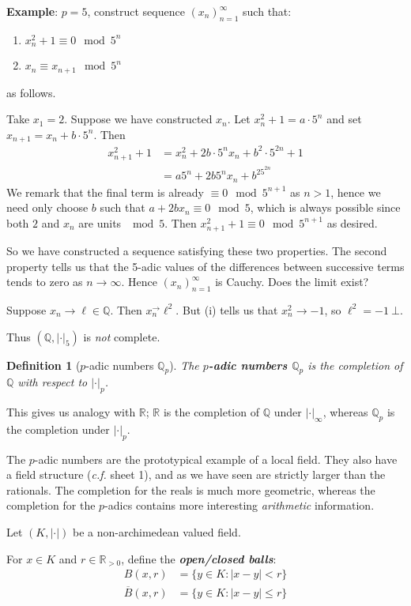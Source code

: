 \documentclass[]{article}
\theoremstyle{custhm}
\theoremstyle{cusdef}
\newtheorem{defin}[theorem]{Definition}
\theoremstyle{custhm}
\theoremstyle{custhm}
\theoremstyle{custhm}
\theoremstyle{custhm}
\theoremstyle{cusdef}
\theoremstyle{remark}
\newcommand{\Q}{\mathbb{Q}}
\newcommand{\R}{\mathbb{R}}
\newcommand{\ra}{\rightarrow}
\newcommand{\undf}[1]{\textit{\textbf{#1}}}
\renewcommand{\it}[1]{\textit{#1}}
\newcommand{\val}[1]{\left|#1\right|}
\newcommand{\valk}{(K,|\cdot|)}
\renewcommand{\bar}{\overline}
\begin{document}
\textbf{Example}: $p = 5$, construct sequence $(x_n)_{n=1}^{\infty}$ such that:
\begin{enumerate}[label = (\roman*)]
	\item $x_n^2 + 1 \equiv 0 \mod 5^n$
	\item $x_n \equiv x_{n+1} \mod 5^n$
\end{enumerate}
as follows.

Take $x_1 = 2$. Suppose we have constructed $x_n$. Let $x_n^2 + 1 = a\cdot5^n$ and set $x_{n+1} = x_n + b\cdot5^n$. Then
\begin{align*}
	x_{n+1}^2 + 1 &= x_n^2 + 2b\cdot5^nx_n + b^2\cdot5^{2n} + 1\\
	&=a5^n + 2b5^nx_n + b^25^{2n}
\end{align*}
We remark that the final term is already $\equiv 0 \mod 5^{n+1}$ as $n > 1$, hence we need only choose $b$ such that $a + 2bx_n \equiv 0\mod 5$, which is always possible since both $2$ and $x_n$ are units $\mod 5$. Then $x_{n+1}^2 + 1 \equiv 0 \mod 5^{n+1}$ as desired.

So we have constructed a sequence satisfying these two properties. The second property tells us that the 5-adic values of the differences between successive terms tends to zero as $n\ra\infty$. Hence $(x_n)_{n=1}^{\infty}$ is Cauchy. Does the limit exist?

Suppose $x_n\ra \ell\in\Q$. Then $x_n^\ra\ell^2$. But (i) tells us that $x_n^2\ra-1$, so $\ell^2 = -1\ \bot$.

Thus $(\Q,|\cdot|_5)$ is \it{not} complete.

\begin{defin}[$p$-adic numbers $\Q_p$]
The \undf{$p$-adic numbers $\Q_p$} is the completion of $\Q$ with respect to $|\cdot|_p$.
\end{defin}

This gives us analogy with $\R$; $\R$ is the completion of $\Q$ under $|\cdot|_{\infty}$, whereas $\Q_p$ is the completion under $|\cdot|_p$.

The $p$-adic numbers are the prototypical example of a local field. They also have a field structure (\it{c.f.} sheet 1), and as we have seen are strictly larger than the rationals. The completion for the reals is much more geometric, whereas the completion for the $p$-adics contains more interesting \it{arithmetic} information.

Let $\valk$ be a non-archimedean valued field.

For $x\in K$ and $r\in \R_{>0}$, define the \undf{open/closed balls}:
\begin{align*}
	B(x,r) &= \{y\in K: \val{x-y} < r\}\\
	\bar{B}(x,r)&=\{y\in K:|x-y|\le r\}
\end{align*}
\end{document}
